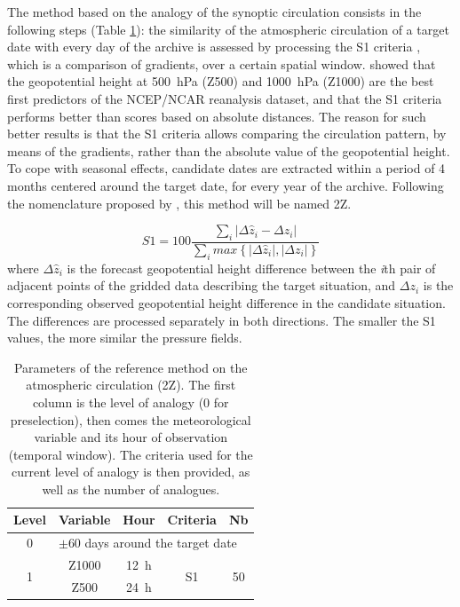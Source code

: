 \documentclass[hess]{copernicus}
\begin{document}
The method based on the analogy of the synoptic circulation consists in the following steps (Table \ref{table:method_2Z}): the similarity of the atmospheric circulation of a target date with every day of the archive is assessed by processing the S1 criteria \citep[Eq.\ \ref{eq:S1}, ][]{Teweles1954, Drosdowsky2003}, which is a comparison of gradients, over a certain spatial window. \citet{Bontron2005} showed that the geopotential height at 500~hPa (Z500) and 1000~hPa (Z1000) are the best first predictors of the NCEP/NCAR reanalysis dataset, and that the S1 criteria performs better than scores based on absolute distances. The reason for such better results is that the S1 criteria allows comparing the circulation pattern, by means of the gradients, rather than the absolute value of the geopotential height. To cope with seasonal effects, candidate dates are extracted within a period of 4 months centered around the target date, for every year of the archive. Following the nomenclature proposed by \citet{Horton2016}, this method will be named 2Z.

\begin{equation}
\label{eq:S1}
S1=100 \frac {\displaystyle \sum_{i} \vert \Delta\hat{z}_{i} - \Delta z_{i} \vert}
{\displaystyle \sum_{i} max\left\lbrace \vert \Delta\hat{z}_{i} \vert , \vert \Delta z_{i} \vert \right\rbrace }
\end{equation}
where $\Delta \hat{z}_{i}$ is the forecast geopotential height difference between the \textit{i}th pair of adjacent points of the gridded data describing the target situation, and $\Delta z_{i}$ is the corresponding observed geopotential height difference in the candidate situation. The differences are processed separately in both directions. The smaller the S1 values, the more similar the pressure fields.

\begin{table}[htb]
	\caption{Parameters of the reference method on the atmospheric circulation (2Z). The first column is the level of analogy (0 for preselection), then comes the meteorological variable and its hour of observation (temporal window). The criteria used for the current level of analogy is then provided, as well as the number of analogues.}
	\footnotesize
	\begin{center}
		\begin{tabular}{ccccc}
			\hline
			Level & Variable & Hour & Criteria & Nb \\ 
			\hline 
			0 & \multicolumn{4}{l}{$\pm 60$ days around the target date} \\
			\hline 
			\multirow{2}{*}{1} & Z1000 & 12~h & \multirow{2}{*}{S1} & \multirow{2}{*}{50} \\
			& Z500 & 24~h & & \\ 
			\hline 
		\end{tabular} 
	\end{center}
	\label{table:method_2Z}
\end{table}
\end{document}
